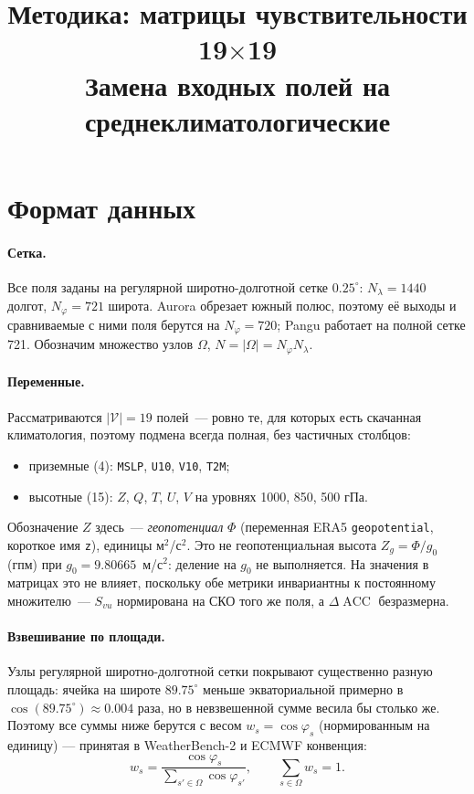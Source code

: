 \documentclass[11pt]{article}
\title{\vspace{-1.4cm}Методика: матрицы чувствительности 19$\times$19\\[2pt]
\large Замена входных полей на среднеклиматологические}
\author{}
\date{}
\begin{document}
\maketitle
\vspace{-1.2cm}

\section{Формат данных}

\paragraph{Сетка.} Все поля заданы на регулярной широтно-долготной сетке $0.25^\circ$:
$N_\lambda = 1440$ долгот, $N_\varphi = 721$ широта. Aurora обрезает южный полюс, поэтому
её выходы и сравниваемые с ними поля берутся на $N_\varphi = 720$; Pangu работает на полной
сетке 721. Обозначим множество узлов $\Omega$, $N = |\Omega| = N_\varphi N_\lambda$.

\paragraph{Переменные.} Рассматриваются $|\mathcal{V}| = 19$ полей~--- ровно те, для которых
есть скачанная климатология, поэтому подмена всегда полная, без частичных столбцов:
\begin{itemize}
\item приземные (4): \texttt{MSLP}, \texttt{U10}, \texttt{V10}, \texttt{T2M};
\item высотные (15): $Z$, $Q$, $T$, $U$, $V$ на уровнях 1000, 850, 500 гПа.
\end{itemize}
Обозначение $Z$ здесь~--- \emph{геопотенциал} $\Phi$ (переменная ERA5 \texttt{geopotential},
короткое имя \texttt{z}), единицы м$^2$/с$^2$. Это не геопотенциальная высота
$Z_g = \Phi/g_0$ (гпм) при $g_0 = 9.80665$~м/с$^2$: деление на $g_0$ не выполняется. На значения
в матрицах это не влияет, поскольку обе метрики инвариантны к постоянному множителю~---
$S_{vu}$ нормирована на СКО того же поля, а $\Delta\!\operatorname{ACC}$ безразмерна.

\paragraph{Взвешивание по площади.} Узлы регулярной широтно-долготной сетки покрывают
существенно разную площадь: ячейка на широте $89.75^\circ$ меньше экваториальной примерно
в $\cos(89.75^\circ)\approx 0.004$ раза, но в невзвешенной сумме весила бы столько же. Поэтому
все суммы ниже берутся с весом $w_s = \cos\varphi_s$ (нормированным на единицу) --- принятая
в WeatherBench-2 и ECMWF конвенция:
\[
w_s = \frac{\cos\varphi_s}{\sum_{s'\in\Omega}\cos\varphi_{s'}},
\qquad \sum_{s\in\Omega} w_s = 1 .
\]
\end{document}
